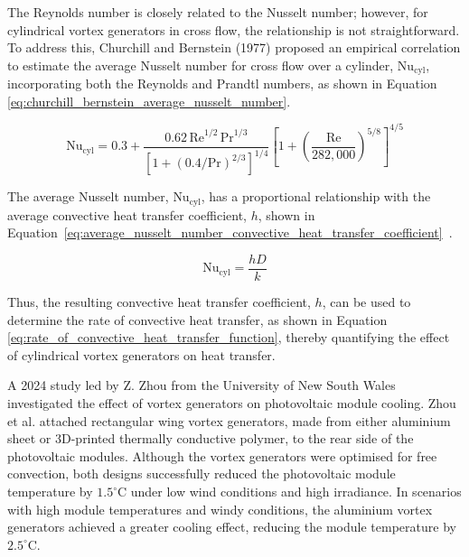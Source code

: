 The Reynolds number is closely related to the Nusselt number; however, for cylindrical vortex generators in cross flow, the relationship is not straightforward. To address this, Churchill and Bernstein (1977) proposed an empirical correlation to estimate the average Nusselt number for cross flow over a cylinder, $\text{Nu}_\text{cyl}$, incorporating both the Reynolds and Prandtl numbers, as shown in Equation \ref{eq:churchill_bernstein_average_nusselt_number}. \cite{Cengel2014ExternalConvection}

\begin{equation}
    \text{Nu}_{\text{cyl}} = 0.3 + \frac{0.62\,\text{Re}^{1/2}\,\text{Pr}^{1/3}}{\left[1 + (0.4/\text{Pr})^{2/3}\right]^{1/4}} \left[1 + \left(\frac{\text{Re}}{282,000}\right)^{5/8}\right]^{4/5}
    \label{eq:churchill_bernstein_average_nusselt_number}
\end{equation}

The average Nusselt number, $\text{Nu}_\text{cyl}$, has a proportional relationship with the average convective heat transfer coefficient, $h$, shown in Equation~\ref{eq:average_nusselt_number_convective_heat_transfer_coefficient}~\cite{Cengel2014ExternalConvection}.

\begin{equation}
    \text{Nu}_{\text{cyl}} = \frac{h D}{k}
    \label{eq:average_nusselt_number_convective_heat_transfer_coefficient}
\end{equation}

Thus, the resulting convective heat transfer coefficient, $h$, can be used to determine the rate of convective heat transfer, as shown in Equation \ref{eq:rate_of_convective_heat_transfer_function}, thereby quantifying the effect of cylindrical vortex generators on heat transfer. \cite{Cengel2014IntroductionConcepts} \vspace{0.5em}

A 2024 study led by Z. Zhou from the University of New South Wales investigated the effect of vortex generators on photovoltaic module cooling. Zhou et al. attached rectangular wing vortex generators, made from either aluminium sheet or 3D-printed thermally conductive polymer, to the rear side of the photovoltaic modules. Although the vortex generators were optimised for free convection, both designs successfully reduced the photovoltaic module temperature by $1.5^{\circ} \text{C}$ under low wind conditions and high irradiance. In scenarios with high module temperatures and windy conditions, the aluminium vortex generators achieved a greater cooling effect, reducing the module temperature by $2.5^{\circ} \text{C}$. \cite{Zhou2024Long-termCooling} \vspace{0.5em}

